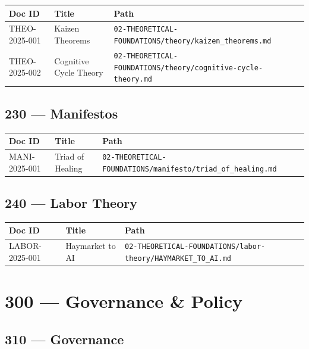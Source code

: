 \documentclass[11pt,a4paper]{article}
\begin{document}
\begin{longtable}{p{2cm}p{8cm}p{3cm}}
\toprule
\textbf{Doc ID} & \textbf{Title} & \textbf{Path} \\
\midrule
THEO-2025-001 & Kaizen Theorems & \texttt{02-THEORETICAL-FOUNDATIONS/theory/kaizen\_theorems.md} \\
THEO-2025-002 & Cognitive Cycle Theory & \texttt{02-THEORETICAL-FOUNDATIONS/theory/cognitive-cycle-theory.md} \\
\bottomrule
\end{longtable}

\subsection{230 — Manifestos}

\begin{longtable}{p{2cm}p{8cm}p{3cm}}
\toprule
\textbf{Doc ID} & \textbf{Title} & \textbf{Path} \\
\midrule
MANI-2025-001 & Triad of Healing & \texttt{02-THEORETICAL-FOUNDATIONS/manifesto/triad\_of\_healing.md} \\
\bottomrule
\end{longtable}

\subsection{240 — Labor Theory}

\begin{longtable}{p{2cm}p{8cm}p{3cm}}
\toprule
\textbf{Doc ID} & \textbf{Title} & \textbf{Path} \\
\midrule
LABOR-2025-001 & Haymarket to AI & \texttt{02-THEORETICAL-FOUNDATIONS/labor-theory/HAYMARKET\_TO\_AI.md} \\
\bottomrule
\end{longtable}

\section{300 — Governance \& Policy}

\subsection{310 — Governance}
\end{document}
